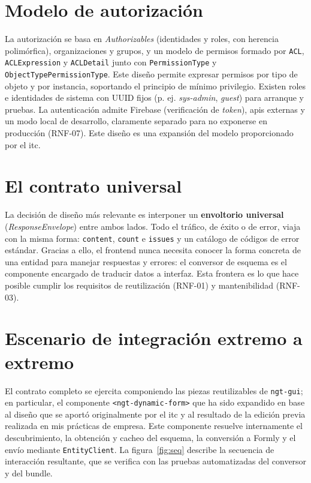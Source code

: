 \section{Modelo de autorización}
La autorización se basa en \emph{Authorizables} (identidades y roles, con
herencia polimórfica), organizaciones y grupos, y un modelo de permisos
formado por \texttt{ACL}, \texttt{ACLExpression} y \texttt{ACLDetail} junto con
\texttt{PermissionType} y \texttt{ObjectTypePermissionType}. Este diseño
permite expresar permisos por tipo de objeto y por instancia, soportando el
principio de mínimo privilegio. Existen roles e identidades de sistema con
UUID fijos (p. ej. \emph{sys-admin}, \emph{guest}) para arranque y pruebas. La
autenticación admite Firebase (verificación de \emph{token}), apis externas y un modo local
de desarrollo, claramente separado para no exponerse en producción (RNF-07). Este diseño es
una expansión del modelo proporcionado por el \gls{itc}.

\section{El contrato universal}
La decisión de diseño más relevante es interponer un \textbf{envoltorio
universal} (\emph{ResponseEnvelope}) entre ambos lados. Todo el tráfico, de
éxito o de error, viaja con la misma forma: \texttt{content}, \texttt{count}
e \texttt{issues} y un catálogo de códigos de error estándar. Gracias a
ello, el frontend nunca necesita conocer la forma concreta de una entidad para
manejar respuestas y errores: el conversor de esquema es el componente encargado de
traducir datos a interfaz. Esta frontera es lo que hace posible cumplir los
requisitos de reutilización (RNF-01) y mantenibilidad (RNF-03).

\section{Escenario de integración extremo a extremo}
El contrato completo se ejercita componiendo las piezas reutilizables de
\texttt{ngt-gui}; en particular, el componente \texttt{<ngt-dynamic-form>} que
ha sido expandido en base al diseño que se aportó originalmente por el \gls{itc} 
y al resultado de la edición previa realizada en mis prácticas de empresa. Este componente
resuelve internamente el descubrimiento, la obtención y cacheo del esquema, la
conversión a Formly y el envío mediante \texttt{EntityClient}. La
figura~\ref{fig:seq} describe la secuencia de interacción resultante, que se
verifica con las pruebas automatizadas del conversor y del bundle.

